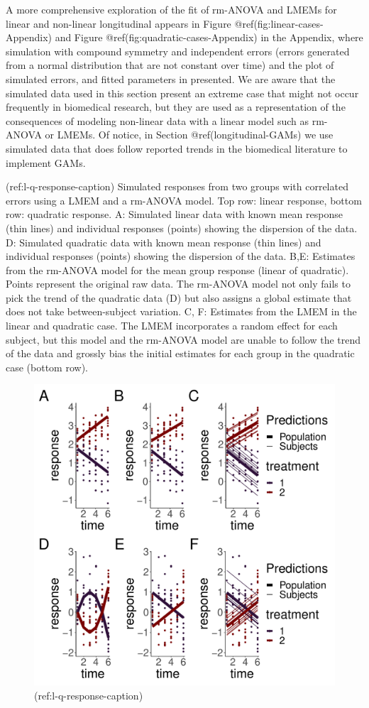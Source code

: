 \documentclass[Royal,times,sagev]{sagej}
\begin{document}
A more comprehensive exploration of the fit of rm-ANOVA and LMEMs for
linear and non-linear longitudinal appears in Figure
@ref(fig:linear-cases-Appendix) and Figure
@ref(fig:quadratic-cases-Appendix) in the Appendix, where simulation
with compound symmetry and independent errors (errors generated from a
normal distribution that are not constant over time) and the plot of
simulated errors, and fitted parameters in presented. We are aware that
the simulated data used in this section present an extreme case that
might not occur frequently in biomedical research, but they are used as
a representation of the consequences of modeling non-linear data with a
linear model such as rm-ANOVA or LMEMs. Of notice, in Section
@ref(longitudinal-GAMs) we use simulated data that does follow reported
trends in the biomedical literature to implement GAMs.

(ref:l-q-response-caption) Simulated responses from two groups with
correlated errors using a LMEM and a rm-ANOVA model. Top row: linear
response, bottom row: quadratic response. A: Simulated linear data with
known mean response (thin lines) and individual responses (points)
showing the dispersion of the data. D: Simulated quadratic data with
known mean response (thin lines) and individual responses (points)
showing the dispersion of the data. B,E: Estimates from the rm-ANOVA
model for the mean group response (linear of quadratic). Points
represent the original raw data. The rm-ANOVA model not only fails to
pick the trend of the quadratic data (D) but also assigns a global
estimate that does not take between-subject variation. C, F: Estimates
from the LMEM in the linear and quadratic case. The LMEM incorporates a
random effect for each subject, but this model and the rm-ANOVA model
are unable to follow the trend of the data and grossly bias the initial
estimates for each group in the quadratic case (bottom row).

\begin{figure}

{\centering \includegraphics[width=0.75\linewidth]{Full_document_SAGE_files/figure-latex/l-q-response-1} 

}

\caption{(ref:l-q-response-caption)}\label{fig:l-q-response}
\end{figure}
\end{document}
